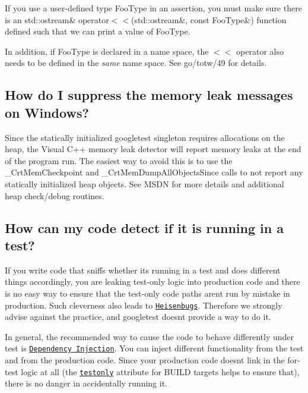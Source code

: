 If you use a user-\/defined type {\ttfamily Foo\+Type} in an assertion, you must make sure there is an {\ttfamily std\+::ostream\& operator$<$$<$(std\+::ostream\&, const Foo\+Type\&)} function defined such that we can print a value of {\ttfamily Foo\+Type}.

In addition, if {\ttfamily Foo\+Type} is declared in a name space, the {\ttfamily $<$$<$} operator also needs to be defined in the {\itshape same} name space. See go/totw/49 for details.

\subsection*{How do I suppress the memory leak messages on Windows?}

Since the statically initialized googletest singleton requires allocations on the heap, the Visual C++ memory leak detector will report memory leaks at the end of the program run. The easiest way to avoid this is to use the {\ttfamily \+\_\+\+Crt\+Mem\+Checkpoint} and {\ttfamily \+\_\+\+Crt\+Mem\+Dump\+All\+Objects\+Since} calls to not report any statically initialized heap objects. See M\+S\+DN for more details and additional heap check/debug routines.

\subsection*{How can my code detect if it is running in a test?}

If you write code that sniffs whether it\textquotesingle{}s running in a test and does different things accordingly, you are leaking test-\/only logic into production code and there is no easy way to ensure that the test-\/only code paths aren\textquotesingle{}t run by mistake in production. Such cleverness also leads to \href{https://en.wikipedia.org/wiki/Heisenbug}{\tt Heisenbugs}. Therefore we strongly advise against the practice, and googletest doesn\textquotesingle{}t provide a way to do it.

In general, the recommended way to cause the code to behave differently under test is \href{https://en.wikipedia.org/wiki/Dependency_injection}{\tt Dependency Injection}. You can inject different functionality from the test and from the production code. Since your production code doesn\textquotesingle{}t link in the for-\/test logic at all (the \href{https://docs.bazel.build/versions/master/be/common-definitions.html#common.testonly}{\tt {\ttfamily testonly}} attribute for B\+U\+I\+LD targets helps to ensure that), there is no danger in accidentally running it.

